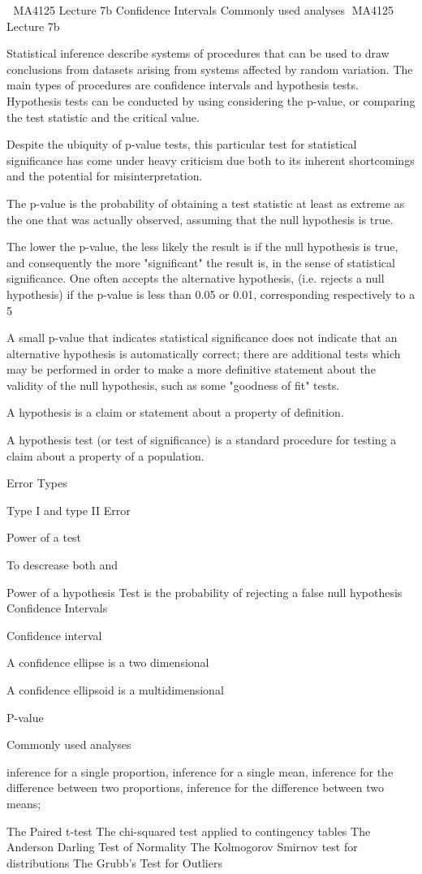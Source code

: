 

MA4125 Lecture 7b
Confidence Intervals
Commonly used analyses
MA4125 Lecture 7b
 
Statistical inference describe systems of procedures that can be used to draw conclusions from datasets arising from systems affected by random variation. The main types of procedures are confidence intervals and hypothesis tests. Hypothesis tests can be conducted by using considering the p-value, or comparing the test statistic and the critical value.
 
Despite the ubiquity of p-value tests, this particular test for statistical significance has come under heavy criticism due both to its inherent shortcomings and the potential for misinterpretation.

The p-value is the probability of obtaining a test statistic at least as extreme as the one that was actually observed,
assuming that the null hypothesis is true.
 
The lower the p-value, the less likely the result is if the null hypothesis is true, and consequently the more "significant" the result is, in the sense of statistical significance. One often accepts the alternative hypothesis, (i.e. rejects a null hypothesis) if the p-value is less than 0.05 or 0.01, corresponding respectively to a 5%
 
A small p-value that indicates statistical significance does not indicate that an alternative hypothesis is automatically correct; there are additional tests which may be performed in order to make a more definitive statement about the validity of the null hypothesis, such as some "goodness of fit" tests.
 
A hypothesis is a claim or statement about a property of definition.
 
A hypothesis test (or test of significance) is a standard procedure for testing a claim about a property of a population.
 
 
Error Types
 
Type I and type II Error
 
Power of a test
 
To descrease both  and 
 
 
Power of a hypothesis Test is the probability of rejecting a false null hypothesis
Confidence Intervals
 
Confidence interval
 
A confidence ellipse is a two dimensional
 
A confidence ellipsoid is a multidimensional
 
P-value
 

Commonly used analyses
 
inference for a single proportion,
inference for a single mean,
inference for the difference between two proportions,
inference for the difference between two means;
 
 
The Paired t-test
The chi-squared test applied to contingency tables
The Anderson Darling Test of Normality
The Kolmogorov Smirnov test for distributions
The Grubb's Test for Outliers
 
 
 
